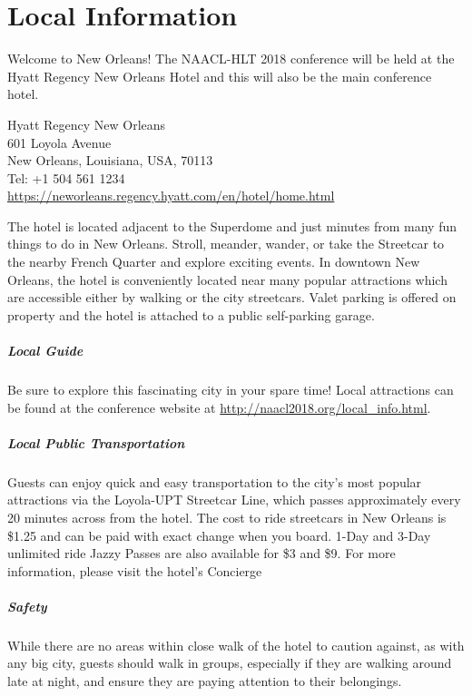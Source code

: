 \chapter{Local Information}

Welcome to New Orleans!  The NAACL-HLT 2018 conference will be held at the Hyatt Regency New Orleans Hotel and this will also be the main conference hotel.

Hyatt Regency New Orleans \\
601 Loyola Avenue \\
New Orleans, Louisiana, USA, 70113 \\
Tel: +1 504 561 1234\\
\url{https://neworleans.regency.hyatt.com/en/hotel/home.html}

The hotel is located adjacent to the Superdome and just minutes from many fun things to do in New Orleans. Stroll, meander, wander, or take the Streetcar to the nearby French Quarter and explore exciting events.  In downtown New Orleans, the hotel is conveniently located near many popular attractions which are accessible either by walking or the city streetcars. Valet parking is offered on property and the hotel is attached to a public self-parking garage. 

\paragraph{Local Guide}

Be sure to explore this fascinating city in your spare time!  Local attractions can be found at the conference website at \url{http://naacl2018.org/local_info.html}.


\paragraph{Local Public Transportation}

Guests can enjoy quick and easy transportation to the city’s most popular attractions via the Loyola-UPT Streetcar Line, which passes approximately every 20 minutes across from the hotel. The cost to ride streetcars in New Orleans is \$1.25 and can be paid with exact change when you board. 1-Day and 3-Day unlimited ride Jazzy Passes are also available for \$3 and \$9. For more information, please visit the hotel’s Concierge

\paragraph{Safety}

While there are no areas within close walk of the hotel to caution against, as with any big city, guests should walk in groups, especially if they are walking around late at night, and ensure they are paying attention
to their belongings.




